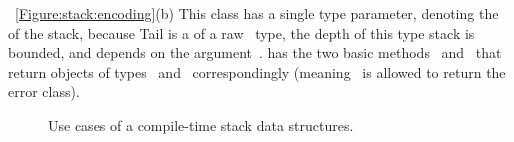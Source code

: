 ~\cref{Figure:stack:encoding}(b) %
This class has a single type parameter, denoting the~ of the stack, because Tail is a
  of a raw~ type, the depth of this type stack is bounded, and depends on the argument~.
 has the two basic methods~ and~ that return objects of types~ and~
  correspondingly (meaning~ is allowed to return the error class).
  
\begin{figure}[htb]
  \caption{\label{Figure:stack-use-cases}%
    Use cases of a compile-time stack data structures.
  }
\end{figure}

